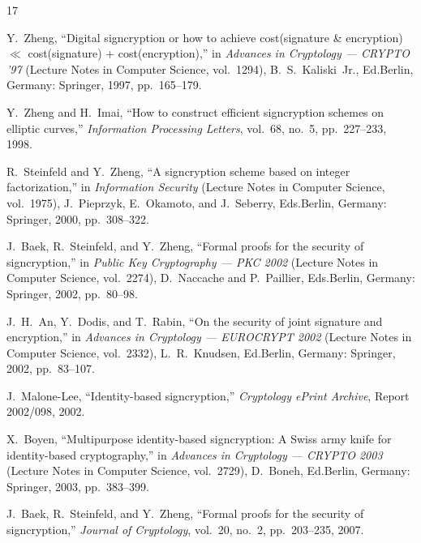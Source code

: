 \documentclass[11pt,a4paper]{article}
\begin{document}
\begin{thebibliography}{17}

Y.~Zheng, ``Digital signcryption or how to achieve cost(signature \& encryption) $\ll$ cost(signature) + cost(encryption),'' in \textit{Advances in Cryptology --- CRYPTO '97} (Lecture Notes in Computer Science, vol.~1294), B.~S.~Kaliski~Jr., Ed.\hspace{1em}Berlin, Germany: Springer, 1997, pp.~165--179.

Y.~Zheng and H.~Imai, ``How to construct efficient signcryption schemes on elliptic curves,'' \textit{Information Processing Letters}, vol.~68, no.~5, pp.~227--233, 1998.

R.~Steinfeld and Y.~Zheng, ``A signcryption scheme based on integer factorization,'' in \textit{Information Security} (Lecture Notes in Computer Science, vol.~1975), J.~Pieprzyk, E.~Okamoto, and J.~Seberry, Eds.\hspace{1em}Berlin, Germany: Springer, 2000, pp.~308--322.

J.~Baek, R.~Steinfeld, and Y.~Zheng, ``Formal proofs for the security of signcryption,'' in \textit{Public Key Cryptography --- PKC 2002} (Lecture Notes in Computer Science, vol.~2274), D.~Naccache and P.~Paillier, Eds.\hspace{1em}Berlin, Germany: Springer, 2002, pp.~80--98.

J.~H.~An, Y.~Dodis, and T.~Rabin, ``On the security of joint signature and encryption,'' in \textit{Advances in Cryptology --- EUROCRYPT 2002} (Lecture Notes in Computer Science, vol.~2332), L.~R.~Knudsen, Ed.\hspace{1em}Berlin, Germany: Springer, 2002, pp.~83--107.

J.~Malone-Lee, ``Identity-based signcryption,'' \textit{Cryptology ePrint Archive}, Report 2002/098, 2002.

X.~Boyen, ``Multipurpose identity-based signcryption: A Swiss army knife for identity-based cryptography,'' in \textit{Advances in Cryptology --- CRYPTO 2003} (Lecture Notes in Computer Science, vol.~2729), D.~Boneh, Ed.\hspace{1em}Berlin, Germany: Springer, 2003, pp.~383--399.

J.~Baek, R.~Steinfeld, and Y.~Zheng, ``Formal proofs for the security of signcryption,'' \textit{Journal of Cryptology}, vol.~20, no.~2, pp.~203--235, 2007.


\end{thebibliography}
\end{document}
